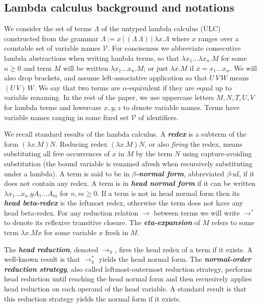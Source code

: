 \documentclass[xchauthor,chkrefs,GCNS,amsmath,amsthm,rotating,leaveRGB]{tcsg}
\renewcommand{\index}[1]{}
\theoremstyle{plain}
\theoremstyle{definition}
\newcommand{\VarSet}{\mathcal{V}}
\begin{document}
\subsection{Lambda calculus background and notations}\label{sec:lambdacalculus_basics}

We consider the set of terms $\Lambda $ of the untyped lambda calculus (ULC)
constructed from the grammar $\Lambda := x\ |\ (\Lambda \, \Lambda )\ |\
\lambda x. \Lambda $ where $x$ ranges over a countable set of variable names
$\VarSet $. For conciseness we abbreviate consecutive lambda abstractions
when writing lambda terms, so that $\lambda x_{1} \ldots \lambda x_{n} . M$
for some $n\geq 0$ and term $M$ will be written $\lambda x_{1} \ldots x_{n} .
M$; or just $\lambda \overline{x} . M$ if $\overline{x} = x_{1} \ldots
x_{n}$. We will also drop brackets, and assume left-associative application
so that $U\,V\,W$ means $(U\,V)\,W$. We say that two terms are $\alpha
$-equivalent if they are equal up to variable renaming. In the rest of the
paper, we use uppercase letters $M, N, T, U, V$ for lambda terms and
lowercase $x,y,z$ to denote variable names. Terms have variable names ranging
in some fixed set $\VarSet $ of identifiers.

We recall standard results of the lambda calculus. A
\textbf{\emph{redex}}\index{redex} is a subterm of the form $(\lambda x. M)
N$. Reducing redex $(\lambda x. M) N$, or also \emph{firing} the redex, means
substituting all free occurrences of $x$ in $M$ by the term $N$ using
capture-avoiding substitution (the bound variable is renamed afresh when
recursively substituting under a lambda). A term is said to be in
\textbf{\emph{$\beta  $-normal form}}\index{$\beta  $-normal form},
abbreviated $\beta $-nf, if it does not contain any redex. A term is in
\textbf{\emph{head normal form}}\index{head normal form} if it can be written
$\lambda x_{1} \ldots x_{n} . y A_{1} \ldots A_{m}$ for $n,m\geq 0$. If a
term is not in head normal form then its \textbf{\emph{head
beta-redex}}\index{head beta-redex} is the leftmost redex, otherwise the term
does not have any head beta-redex. For any reduction relation $\rightarrow $
between terms we will write $\rightarrow ^{*}$ to denote its reflexive
transitive closure. The \textbf{\emph{eta-expansion}}\index{eta-expansion} of
$M$ refers to some term $\lambda x. M x $ for some variable $x$ fresh in $M$.

The \textbf{\emph{head reduction}}\index{head reduction}, denoted
$\rightarrow _{h}$, fires the head redex of a term if it exists. A well-known
result is that $\rightarrow ^{*}_{h}$ yields the head normal form. The
\textbf{\emph{normal-order reduction strategy}}\index{normal-order reduction
strategy}, also called leftmost-outermost reduction strategy, performs head
reduction until reaching the head normal form and then recursively applies
head reduction on each operand of the head variable. A standard result is
that this reduction strategy yields the normal form if it exists.
\end{document}
